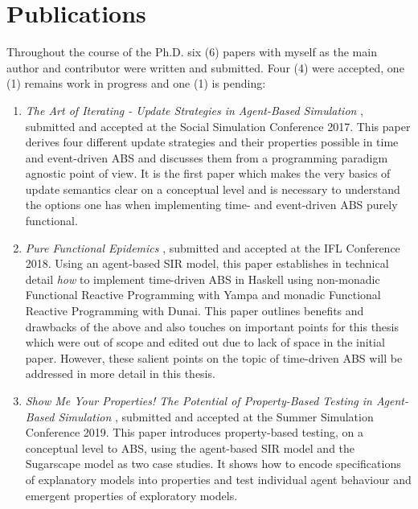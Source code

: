\section*{Publications}
Throughout the course of the Ph.D. six (6) papers with myself as the main author and contributor were written and submitted. Four (4) were accepted, one (1) remains work in progress and one (1) is pending:

\begin{enumerate}
	\item \textit{The Art of Iterating - Update Strategies in Agent-Based Simulation} \cite{payne_social_2019, thaler_art_2017}, submitted and accepted at the Social Simulation Conference 2017. This paper derives four different update strategies and their properties possible in time and event-driven ABS and discusses them from a programming paradigm agnostic point of view. It is the first paper which makes the very basics of update semantics clear on a conceptual level and is necessary to understand the options one has when implementing time- and event-driven ABS purely functional.
	
	\item \textit{Pure Functional Epidemics} \cite{thaler_pure_2018}, submitted and accepted at the IFL Conference 2018. Using an agent-based SIR model, this paper establishes in technical detail \textit{how} to implement time-driven ABS in Haskell using non-monadic Functional Reactive Programming with Yampa and monadic Functional Reactive Programming with Dunai. This paper outlines benefits and drawbacks of the above and also touches on important points for this thesis which were out of scope and edited out due to lack of space in the initial paper. However, these salient points on the topic of time-driven ABS will be addressed in more detail in this thesis.

	\item \textit{Show Me Your Properties! The Potential of Property-Based Testing in Agent-Based Simulation} \cite{thaler_show_2019}, submitted and accepted at the Summer Simulation Conference 2019. This paper introduces property-based testing, on a conceptual level to ABS, using the agent-based SIR model and the Sugarscape model as two case studies. It shows how to encode specifications of explanatory models into properties and test individual agent behaviour and emergent properties of exploratory models.
	

\end{enumerate}
